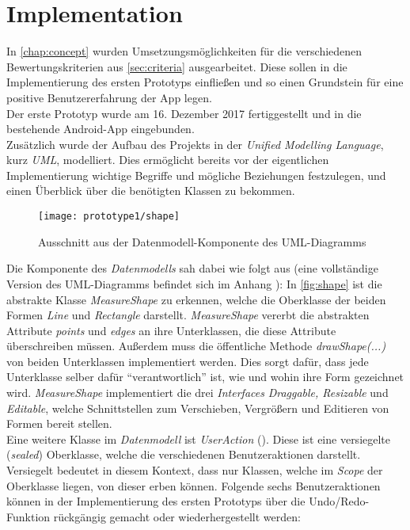 \section{Implementation}\label{sec:pro1}
In \autoref{chap:concept} wurden Umsetzungsmöglichkeiten für die verschiedenen Bewertungskriterien aus \autoref{sec:criteria} ausgearbeitet.
Diese sollen in die Implementierung des ersten Prototyps einfließen und so einen Grundstein für eine positive Benutzererfahrung der App legen. \\

Der erste Prototyp wurde am 16. Dezember 2017 fertiggestellt und in die bestehende Android-App eingebunden. \\

\noindent
Zusätzlich wurde der Aufbau des Projekts in der \emph{Unified Modelling Language}, kurz \emph{UML}, modelliert.
Dies ermöglicht bereits vor der eigentlichen Implementierung wichtige Begriffe und mögliche Beziehungen festzulegen, und einen Überblick über die benötigten Klassen zu bekommen.

\begin{figure}[h]
  \centering
  \texttt{[image: prototype1/shape]}
  \caption{Ausschnitt aus der Datenmodell-Komponente des UML-Diagramms}
  \label{fig:shape}
\end{figure}

\noindent
Die Komponente des \emph{Datenmodells} sah dabei wie folgt aus (eine vollständige Version des UML-Diagramms befindet sich im Anhang ):
In \autoref{fig:shape} ist die abstrakte Klasse \emph{MeasureShape} zu erkennen, welche die Oberklasse der beiden Formen \emph{Line} und \emph{Rectangle} darstellt.
\emph{MeasureShape} vererbt die abstrakten Attribute \emph{points} und \emph{edges} an ihre Unterklassen, die diese Attribute überschreiben müssen.
Außerdem muss die öffentliche Methode \emph{drawShape(...)} von beiden Unterklassen implementiert werden.
Dies sorgt dafür, dass jede Unterklasse selber dafür ``verantwortlich'' ist, wie und wohin ihre Form gezeichnet wird.
\emph{MeasureShape} implementiert die drei \emph{Interfaces} \emph{Draggable, Resizable} und \emph{Editable}, welche Schnittstellen zum Verschieben, Vergrößern und Editieren von Formen bereit stellen. \\

\noindent
Eine weitere Klasse im \emph{Datenmodell} ist \emph{UserAction} ().
Diese ist eine versiegelte (\emph{sealed}) Oberklasse, welche die verschiedenen Benutzeraktionen darstellt.
Versiegelt bedeutet in diesem Kontext, dass nur Klassen, welche im \emph{Scope} der Oberklasse liegen, von dieser erben können.
Folgende sechs Benutzeraktionen können in der Implementierung des ersten Prototyps über die Undo/Redo-Funktion rückgängig gemacht oder wiederhergestellt werden:

